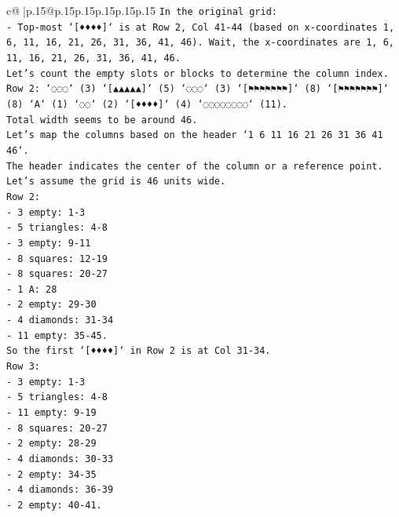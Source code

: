 \documentclass{article}
\begin{document}
{\begin{supertabular}{c@{$\;$}|p{.15\linewidth}@{}p{.15\linewidth}p{.15\linewidth}p{.15\linewidth}p{.15\linewidth}p{.15\linewidth}}
{{{\texttt{In the original grid:} \\
\texttt{{-} Top{-}most `{[}♦♦♦♦{]}` is at Row 2, Col 41{-}44 (based on x{-}coordinates 1, 6, 11, 16, 21, 26, 31, 36, 41, 46). Wait, the x{-}coordinates are 1, 6, 11, 16, 21, 26, 31, 36, 41, 46.} \\
\texttt{Let's count the empty slots or blocks to determine the column index.} \\
\texttt{Row 2: `◌◌◌` (3) `{[}▲▲▲▲▲{]}` (5) `◌◌◌` (3) `{[}⚑⚑⚑⚑⚑⚑⚑{]}` (8) `{[}⚑⚑⚑⚑⚑⚑⚑{]}` (8) `A` (1) `◌◌` (2) `{[}♦♦♦♦{]}` (4) `◌◌◌◌◌◌◌◌` (11).} \\
\texttt{Total width seems to be around 46.} \\
\texttt{Let's map the columns based on the header `1    6    11   16   21   26   31   36   41   46`.} \\
\texttt{The header indicates the center of the column or a reference point.} \\
\texttt{Let's assume the grid is 46 units wide.} \\
\texttt{Row 2:} \\
\texttt{{-} 3 empty: 1{-}3} \\
\texttt{{-} 5 triangles: 4{-}8} \\
\texttt{{-} 3 empty: 9{-}11} \\
\texttt{{-} 8 squares: 12{-}19} \\
\texttt{{-} 8 squares: 20{-}27} \\
\texttt{{-} 1 A: 28} \\
\texttt{{-} 2 empty: 29{-}30} \\
\texttt{{-} 4 diamonds: 31{-}34} \\
\texttt{{-} 11 empty: 35{-}45.} \\
\texttt{So the first `{[}♦♦♦♦{]}` in Row 2 is at Col 31{-}34.} \\
\texttt{Row 3:} \\
\texttt{{-} 3 empty: 1{-}3} \\
\texttt{{-} 5 triangles: 4{-}8} \\
\texttt{{-} 11 empty: 9{-}19} \\
\texttt{{-} 8 squares: 20{-}27} \\
\texttt{{-} 2 empty: 28{-}29} \\
\texttt{{-} 4 diamonds: 30{-}33} \\
\texttt{{-} 2 empty: 34{-}35} \\
\texttt{{-} 4 diamonds: 36{-}39} \\
\texttt{{-} 2 empty: 40{-}41.} \\
}}}
\end{supertabular}}
\end{document}
